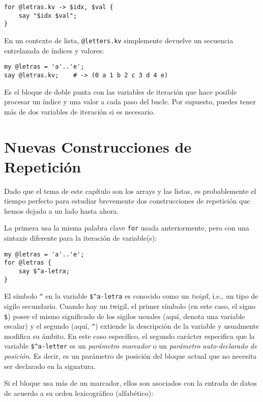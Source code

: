 \begin{verbatim}
for @letras.kv -> $idx, $val { 
    say "$idx $val";
}
\end{verbatim}

En un contexto de lista, \verb|@letters.kv| simplemente
devuelve un secuencia entrelazada de índices y valores:

\begin{verbatim}
my @letras = 'a'..'e';
say @letras.kv;    # -> (0 a 1 b 2 c 3 d 4 e)
\end{verbatim}

Es el bloque de doble punta con las variables de iteración
que hace posible procesar un índice y una valor 
a cada paso del bucle. Por supuesto, puedes tener 
más de dos variables de iteración si es necesario.


\section{Nuevas Construcciones de Repetición}

Dado que el tema de este capítulo son los arrays y las 
listas, es probablemente el tiempo perfecto para estudiar
brevemente dos construcciones de repetición que hemos
dejado a un lado hasta ahora.

La primera usa la misma palabra clave {\tt for} usada
anteriormente, pero con una sintaxis diferente para la iteración
de variable(s):

\begin{verbatim}
my @letras = 'a'..'e';
for @letras { 
    say $^a-letra; 
}
\end{verbatim}

El símbolo \verb|^| en la variable \verb|$^a-letra| es conocido
como un \emph{twigil}, i.e., un tipo de sigilo secundario. 
Cuando hay un twigil, el primer símbolo (en este caso, el signo
\verb|$|) posee el mismo significado de los sigilos usuales (aquí, denota
una variable escalar) y el segundo (aquí, \verb|^|) extiende la descripción
de la variable y usualmente modifica su ámbito. En este caso
específico, el segundo carácter especifica que la variable
\verb|$^a-letter| es un \emph{parámetro marcador} o un 
\emph{parámetro auto-declarado de posición}. Es decir, es un parámetro
de posición del bloque actual que no necesita ser declarado en la 
signatura.

Si el bloque usa más de un marcador, ellos son asociados con la
entrada de datos de acuerdo a su orden lexicográfico (alfabético):

